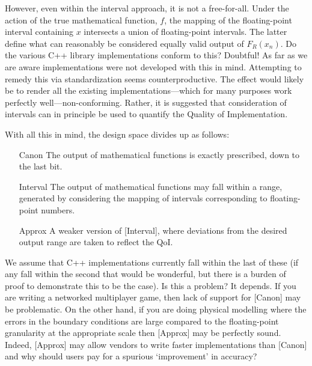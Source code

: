 \documentclass[prd,twocolumn,amsmath,amssymb,nofootinbib,eqsecnum]{revtex4-1}
\begin{document}
However, even within the interval approach, it is not a free-for-all. Under the action of the true mathematical function, $f$, the mapping of the floating-point interval containing $x$ intersects a union of floating-point intervals. The latter define what can reasonably be considered equally valid output of $F_R(x_n)$. Do the various C++ library implementations conform to this? Doubtful! As far as we are 
aware implementations were not developed with this in mind.
Attempting to remedy this via standardization seems
counterproductive. The effect would likely be to render all the existing implementations---which for many purposes work perfectly well---non-conforming. Rather, it is suggested that consideration of intervals can
in principle be used to quantify the Quality of Implementation.

With all this in mind, the design space divides up as follows:
\begin{enumerate}
	\item[Canon] The output of mathematical functions is exactly prescribed, down to the last bit.
	
	\item[Interval] The output of mathematical functions may fall within a range, generated by considering the mapping of intervals corresponding to floating-point numbers.
	
	\item[Approx] A weaker version of [Interval], where deviations from the desired output range 
	are taken to reflect the QoI.
\end{enumerate}

We assume that C++ implementations currently fall within the last of these (if any fall within the second that would be wonderful, but there is a burden of proof to demonstrate this to be the case). Is this a problem? It depends. If you are writing a networked multiplayer game, then lack of support for [Canon] may be problematic. On the other hand, if you are doing physical modelling where the errors in the boundary conditions are large compared to the floating-point granularity at the appropriate scale then [Approx] may be perfectly sound. Indeed, [Approx] may allow vendors to write faster implementations than [Canon] and why should users pay for a spurious `improvement' in accuracy?
\end{document}
